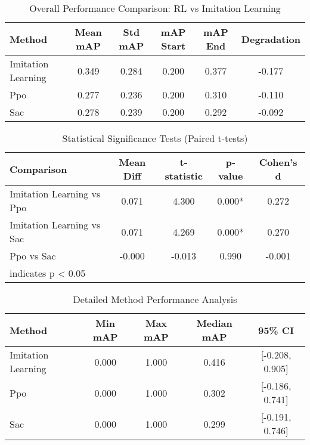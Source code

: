 
\begin{table}[htbp]
\centering
\caption{Overall Performance Comparison: RL vs Imitation Learning}
\label{tab:overall_performance}
\begin{tabular}{lccccc}
\toprule
Method & Mean mAP & Std mAP & mAP Start & mAP End & Degradation \\
\midrule

Imitation Learning & 0.349 & 0.284 & 0.200 & 0.377 & -0.177 \\
Ppo & 0.277 & 0.236 & 0.200 & 0.310 & -0.110 \\
Sac & 0.278 & 0.239 & 0.200 & 0.292 & -0.092 \\

\bottomrule
\end{tabular}
\end{table}


\begin{table}[htbp]
\centering
\caption{Statistical Significance Tests (Paired t-tests)}
\label{tab:statistical_tests}
\begin{tabular}{lcccc}
\toprule
Comparison & Mean Diff & t-statistic & p-value & Cohen's d \\
\midrule

Imitation Learning vs Ppo & 0.071 & 4.300 & 0.000* & 0.272 \\
Imitation Learning vs Sac & 0.071 & 4.269 & 0.000* & 0.270 \\
Ppo vs Sac & -0.000 & -0.013 & 0.990 & -0.001 \\

\bottomrule
\multicolumn{5}{l}{\footnotesize * indicates p < 0.05} \\
\end{tabular}
\end{table}


\begin{table}[htbp]
\centering
\caption{Detailed Method Performance Analysis}
\label{tab:detailed_performance}
\begin{tabular}{lcccc}
\toprule
Method & Min mAP & Max mAP & Median mAP & 95\% CI \\
\midrule

Imitation Learning & 0.000 & 1.000 & 0.416 & [-0.208, 0.905] \\
Ppo & 0.000 & 1.000 & 0.302 & [-0.186, 0.741] \\
Sac & 0.000 & 1.000 & 0.299 & [-0.191, 0.746] \\

\bottomrule
\end{tabular}
\end{table}
